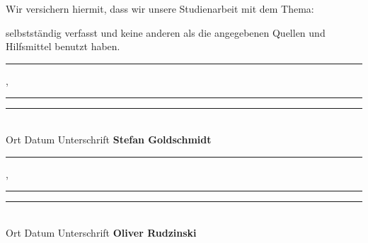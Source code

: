 \vfill
Wir versichern hiermit, dass wir unsere Studienarbeit mit dem Thema:
\begin{center}
	\vspace{1.0cm}
	\textit{\@title}
	\vspace{1.0cm}
\end{center}
selbstständig verfasst und
keine anderen als die angegebenen Quellen und Hilfsmittel benutzt haben. \\


\vfill

\rule{3,5cm}{0.4pt}, \rule{3,5cm}{0.4pt} \hspace{0.38cm} \rule{7cm}{0.4pt}\\
Ort
\hspace{2.9cm}
Datum
\hspace{2.6cm}
Unterschrift \textbf{Stefan Goldschmidt}

\vspace{1cm}

\rule{3,5cm}{0.4pt}, \rule{3,5cm}{0.4pt} \hspace{0.38cm} \rule{7cm}{0.4pt}\\
Ort
\hspace{2.9cm}
Datum
\hspace{2.6cm}
Unterschrift \textbf{Oliver Rudzinski}